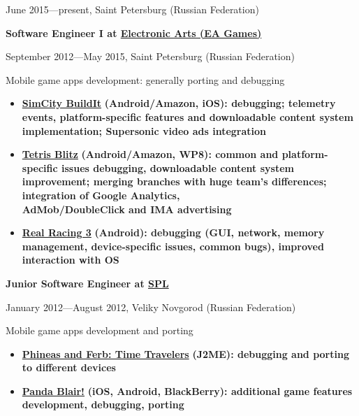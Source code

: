 {
\fontsize{9pt}{8pt}\selectfont
June 2015---present, Saint Petersburg (Russian Federation)
}
\vspace{0.5cm}

{
\fontsize{12pt}{12pt}\selectfont
\bfseries Software Engineer I at
\href{http://www.ea.com}{Electronic Arts (EA Games)}
\mdseries
}

{
\fontsize{9pt}{8pt}\selectfont
September 2012---May 2015, Saint Petersburg (Russian Federation)
}

\subitem Mobile game apps development: generally porting and debugging
\begin{itemize}[rightmargin=\dimexpr\linewidth-18cm-\leftmargin\relax]
\setlength{\itemindent}{20pt}
\item
    \href{http://www.ea.com/simcity-buildit}
        {\bfseries SimCity BuildIt\mdseries}
        \bfseries (Android/Amazon, iOS)\mdseries:
        debugging;
        telemetry events,
        platform-specific features and
        downloadable content system implementation;
        Supersonic video ads integration
\item
    \href{http://www.tetrisblitz.com}
        {\bfseries Tetris Blitz\mdseries}
        \bfseries (Android/Amazon, WP8)\mdseries:
        common and platform-specific issues debugging,
        downloadable content system improvement;
        merging branches with huge team's differences;
        integration of Google Analytics,\\
        AdMob/DoubleClick and IMA advertising
\item
    \href{http://www.ea.com/real-racing-3}
        {\bfseries Real Racing 3\mdseries}
        \bfseries (Android)\mdseries:
        debugging (GUI, network, memory management, device-specific issues, common bugs),
        improved interaction with OS
\end{itemize}

\vspace{0.5cm}

{
\fontsize{12pt}{12pt}\selectfont
\bfseries Junior Software Engineer at
\href{http://spl.co}{\bfseries SPL\mdseries}
\mdseries
}

{
\fontsize{9pt}{8pt}\selectfont
January 2012---August 2012, Veliky Novgorod (Russian Federation)
}

Mobile game apps development and porting

\begin{itemize}[rightmargin=\dimexpr\linewidth-18cm-\leftmargin\relax]
\setlength{\itemindent}{20pt}
\item
    \href{http://java.mob.org/game/phineas\_and\_ferb\_time\_travelers.html}
        {\bfseries Phineas and Ferb: Time Travelers\mdseries}
        \bfseries (J2ME)\mdseries:
        debugging and porting to different devices
\item
    \href{https://itunes.apple.com/us/app/panda-blair!/id500995558?mt=8}
        {\bfseries Panda Blair!\mdseries}
        \bfseries (iOS, Android, BlackBerry)\mdseries: additional game features development,
        debugging,
        porting
\end{itemize}

